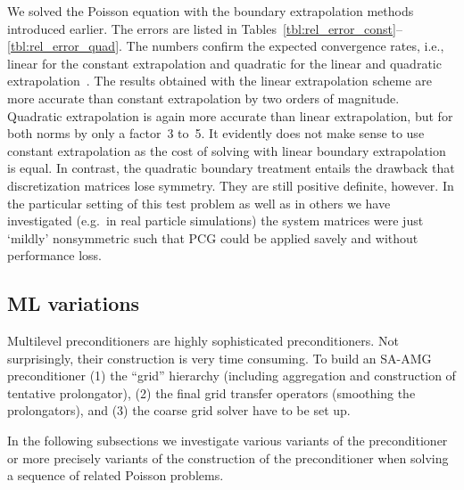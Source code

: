 \documentclass[a4paper,10pt,3p,final,pdftex]{elsarticle}
\begin{document}
We solved the Poisson equation with the boundary extrapolation methods
introduced earlier.  The errors are listed in
Tables~\ref{tbl:rel_error_const}--\ref{tbl:rel_error_quad}.  The numbers
confirm the expected convergence rates, i.e., linear for the constant
extrapolation and quadratic for the linear and quadratic
extrapolation~\cite{joma:05}.  The results obtained with the
linear extrapolation scheme are more accurate than constant
extrapolation by two orders of magnitude.  Quadratic extrapolation is
again more accurate than linear extrapolation, but for both norms by
only a factor~3 to~5.  It evidently does not make sense to use constant
extrapolation as the cost of solving with linear boundary extrapolation
is equal.  In contrast, the quadratic boundary treatment entails the
drawback that discretization matrices lose symmetry.  They are still
positive definite, however.  In the particular setting of this test
problem as well as in others we have investigated (e.g.\ in real
particle simulations) the system matrices were just `mildly'
nonsymmetric such that PCG could be applied savely and without
performance loss.



\subsection{ML variations}\label{sec:ml_var}

Multilevel preconditioners are highly sophisticated preconditioners.
Not surprisingly, their construction is very time consuming.  To build
an SA-AMG preconditioner (1) the ``grid'' hierarchy (including
aggregation and construction of tentative prolongator), (2) the final
grid transfer operators (smoothing the prolongators), and (3) the coarse
grid solver have to be set up.

In the following subsections we investigate various variants of the
preconditioner or more precisely variants of the construction of the
preconditioner when solving a sequence of related Poisson problems.
\end{document}
